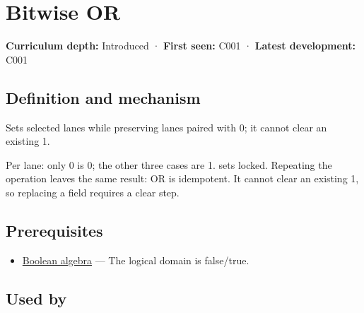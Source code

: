 \hypertarget{appendix-a427ce8ce8a6}{}\label{referencestart:appendix-a427ce8ce8a6}
\section{Bitwise OR}\label{appendix-a427ce8ce8a6-bitwise-or}

\hypertarget{appendix-a427ce8ce8a6-bitwise-or}{}

\textbf{Curriculum depth:} Introduced · \textbf{First seen:} C001 · \textbf{Latest development:} C001

\begin{allmightroledefinition}

\subsection{Definition and mechanism}\label{appendix-a427ce8ce8a6-definition-and-mechanism}

\hypertarget{appendix-a427ce8ce8a6-definition-and-mechanism}{}

Sets selected lanes while preserving lanes paired with 0; it cannot clear an existing 1.

\end{allmightroledefinition}

Per lane: only 0 is 0; the other three cases are 1.  sets locked. Repeating the operation leaves the same result: OR is idempotent. It cannot clear an existing 1, so replacing a field requires a clear step.

\subsection{Prerequisites}\label{appendix-a427ce8ce8a6-prerequisites}

\hypertarget{appendix-a427ce8ce8a6-prerequisites}{}

\begin{itemize}
\tightlist
\item
  \hyperref[appendix-24475e1596a8]{Boolean algebra} --- The logical domain is false/true.
\end{itemize}

\subsection{Used by}\label{appendix-a427ce8ce8a6-used-by}

\hypertarget{appendix-a427ce8ce8a6-used-by}{}

